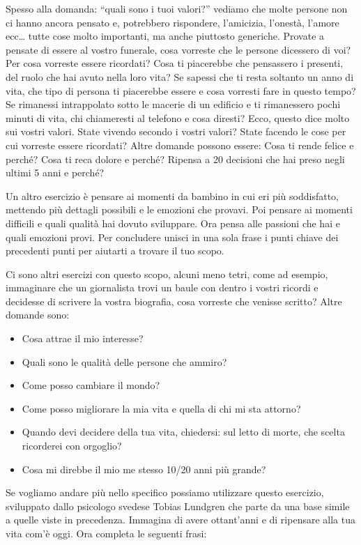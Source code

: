 \documentclass[12pt]{book} %
\begin{document}
Spesso alla domanda: “quali sono i tuoi valori?” vediamo che molte persone non ci hanno ancora pensato e, potrebbero rispondere,
l'amicizia, l'onestà, l'amore ecc… tutte cose molto
importanti, ma anche piuttosto generiche. Provate a pensate di essere al vostro funerale,
cosa vorreste che le persone dicessero di voi? Per cosa vorreste essere ricordati? Cosa ti piacerebbe che pensassero i
presenti, del ruolo che hai avuto nella loro vita? Se sapessi che ti resta soltanto un anno di vita, che tipo di
persona ti piacerebbe essere e cosa vorresti fare in questo tempo? Se rimanessi intrappolato sotto le macerie di un
edificio e ti rimanessero pochi minuti di vita, chi chiameresti al telefono e cosa diresti? Ecco, questo dice molto sui
vostri valori. State vivendo secondo i vostri valori? State facendo le cose per cui vorreste essere ricordati?
Altre domande possono essere:
Cosa ti rende felice e perché?
Cosa ti reca dolore e perché?
Ripensa a 20 decisioni che hai preso negli ultimi 5 anni e perché?

Un altro esercizio è pensare ai momenti da bambino in cui eri più soddisfatto, mettendo più dettagli possibili e le
emozioni che provavi. Poi pensare ai momenti difficili e quali qualità hai dovuto sviluppare. Ora pensa alle passioni
che hai e quali emozioni provi. Per concludere unisci in una sola frase i punti chiave dei precedenti punti per aiutarti a trovare
il tuo scopo.

Ci sono altri esercizi con questo scopo, alcuni meno tetri, come ad esempio, immaginare che un giornalista trovi un
baule con dentro i vostri ricordi e decidesse di scrivere la vostra biografia, cosa vorreste che venisse scritto? Altre
domande sono:

\begin{itemize}
\item Cosa attrae il mio interesse?
\item Quali sono le qualità delle persone che ammiro?
\item Come posso cambiare il mondo?
\item Come posso migliorare la mia vita e quella di chi mi sta attorno? 
\item Quando devi decidere della tua vita, chiedersi: sul letto di morte, che scelta ricorderei con orgoglio? 
\item Cosa mi direbbe il mio me stesso 10/20 anni più grande?
\end{itemize}
Se vogliamo andare più nello specifico possiamo utilizzare questo esercizio, sviluppato dallo psicologo svedese Tobias
Lundgren che parte da una base simile a quelle viste in precedenza. Immagina di avere ottant'anni
e di ripensare alla tua vita com'è oggi. Ora completa le seguenti frasi:
\end{document}
